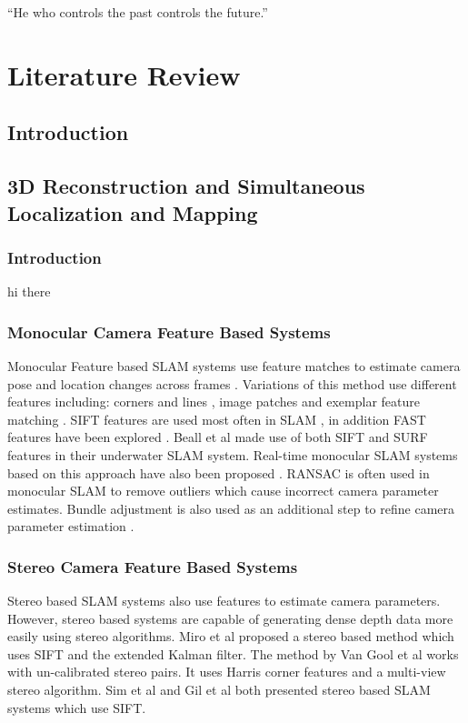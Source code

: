 \begin{savequote}[8cm]
  ``He who controls the past controls the future.''
\end{savequote}
\makeatletter
\chapter{Literature Review}

\section{Introduction}

\section{3D Reconstruction and Simultaneous Localization and Mapping}
\subsection{Introduction}
hi there
\subsection{Monocular Camera Feature Based Systems}
Monocular Feature based SLAM systems use feature matches to estimate camera pose and location changes across frames \cite{Davison02Simultaneous}. Variations of this method use different features including: corners and lines \cite{Jeong06Visual}, image patches \cite{Silveira08Efficient} and exemplar feature matching \cite{Chekhlov07Robust}. SIFT features are used most often in SLAM \cite{Jensfelt06Framework,Pollefeys08Detailed,Beall11Bundle,Eudes10Fast}, in addition FAST features have been explored \cite{Kundu10Realtime,Leelasawassuk133d,Konolige10View,Konolige08Frameslam}. Beall et al \cite{Beall11Bundle} made use of both SIFT and SURF features in their underwater SLAM system. Real-time monocular SLAM systems based on this approach have also been proposed \cite{Chekhlov07Robust,Pollefeys08Detailed}. RANSAC is often used in monocular SLAM \cite{Eudes10Fast,Kundu10Realtime,Konolige10View,Konolige08Frameslam,Pradeep13Monofusion} to remove outliers which cause incorrect camera parameter estimates. Bundle adjustment is also used as an additional step to refine camera parameter estimation \cite{Eudes10Fast}. 
\subsection{Stereo Camera Feature Based Systems}
Stereo based SLAM systems also use features to estimate camera parameters. However, stereo based systems are capable of generating dense depth data more easily using stereo algorithms. Miro et al \cite{Miro06Towards} proposed a stereo based method which uses SIFT and the extended Kalman filter. The method by Van Gool et al \cite{Pollefeys04Visual} works with un-calibrated stereo pairs. It uses Harris corner features and a multi-view stereo algorithm. Sim et al \cite{Sim05Vision} and Gil et al \cite{Gil06Improving} both presented stereo based SLAM systems which use SIFT.
